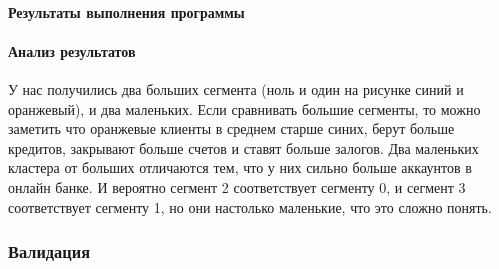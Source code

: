 \documentclass[12pt,a4paper]{article}
\begin{document}
\begin{Shaded}
\begin{Highlighting}[]
\OperatorTok{=}
\NormalTok{labels[labels }\OperatorTok{==} \NormalTok{] }\OperatorTok{=} 
\NormalTok{labels[labels }\OperatorTok{==} \NormalTok{] }\OperatorTok{=} 
\OperatorTok{=}\NormalTok{, }\OperatorTok{=}\NormalTok{(}\NormalTok{, }\NormalTok{))}
\NormalTok{cluster\_hist([}
  \NormalTok{, }\NormalTok{, }\NormalTok{,}
  \NormalTok{, }\NormalTok{, }
\NormalTok{], axs, labels)}

\NormalTok{)}
\end{Highlighting}
\end{Shaded}

  \paragraph*{Результаты выполнения программы}

  \paragraph*{Анализ результатов}
  У нас получились два больших сегмента (ноль и один на рисунке синий и оранжевый), и два маленьких.
  Если сравнивать большие сегменты, то можно заметить что оранжевые клиенты в среднем старше синих,
  берут больше кредитов, закрывают больше счетов и ставят больше залогов.
  Два маленьких кластера от больших отличаются тем, что у них сильно больше аккаунтов в онлайн банке.
  И вероятно сегмент 2 соответствует сегменту 0, и сегмент 3 соответствует сегменту 1, но они настолько маленькие, что это сложно понять.

  \subsubsection{Валидация}
\end{document}
